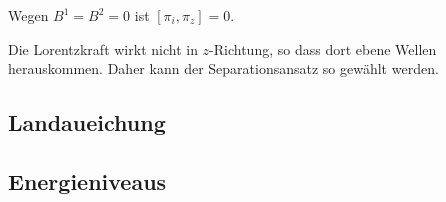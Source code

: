 Wegen $B^1 = B^2 = 0$ ist $[\pi_i, \pi_z] = 0$.

Die Lorentzkraft wirkt nicht in $z$-Richtung, so dass dort ebene Wellen
herauskommen. Daher kann der Separationsansatz so gewählt werden.

\subsection{Landaueichung}
\subsection{Energieniveaus}


\IfFileExists{\bibliographyfile}{
}{}



